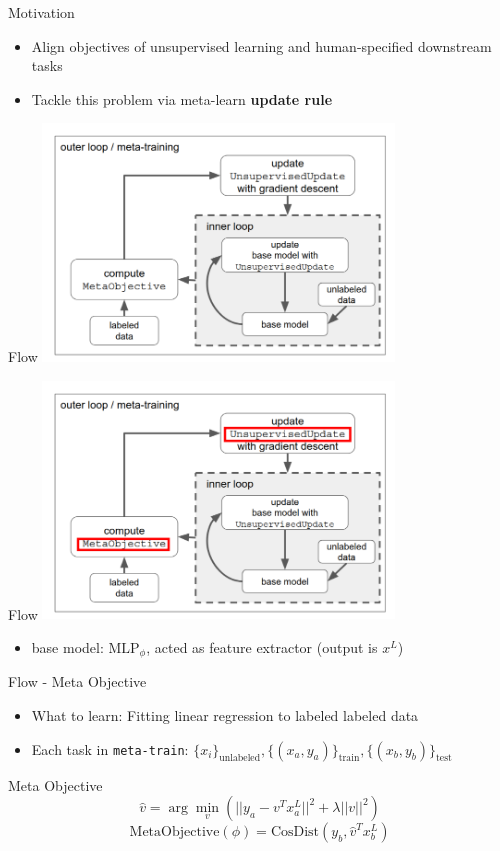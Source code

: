 \documentclass{beamer}
\begin{document}
\begin{frame}{Motivation}
  \begin{itemize}
    \item Align objectives of unsupervised learning and human-specified downstream tasks
    \item Tackle this problem via meta-learn \textbf{update rule}
  \end{itemize}
\end{frame}

\begin{frame}{Flow}
  \center \includegraphics[width=0.7\textwidth]{fig/flow.png}
\end{frame}

\begin{frame}{Flow}
  \center \includegraphics[width=0.7\textwidth]{fig/flow-anno.png}
  \begin{itemize}
    \item base model: $\text{MLP}_{\phi}$, acted as feature extractor (output is $x^L$)
  \end{itemize}
\end{frame}

\begin{frame}{Flow - Meta Objective}
  \begin{itemize}
    \item What to learn: Fitting linear regression to labeled labeled data 
    \item Each task in \texttt{meta-train}: $\lbrace x_i \rbrace_{\text{unlabeled}}, \lbrace (x_a,y_a) \rbrace_\text{train}, \lbrace (x_b,y_b) \rbrace_\text{test}$
  \end{itemize}
  
  \begin{block}{Meta Objective}
    \[ \hat{v} = \arg \min_v (||y_a - v^Tx_a^L||^2 + \lambda ||v||^2) \]
    \[ \text{MetaObjective}(\phi) = \text{CosDist}(y_b,\hat{v}^Tx_b^L) \]
  \end{block}
  
\end{frame}
\end{document}
